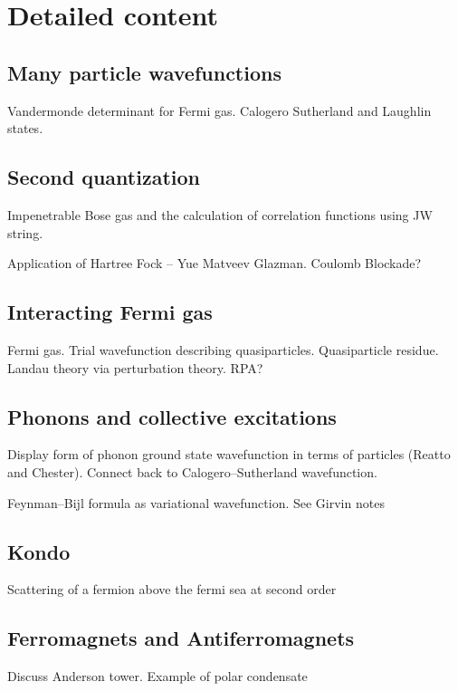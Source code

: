 \section{Detailed content}

\subsection{Many particle wavefunctions}

Vandermonde determinant for Fermi gas. Calogero Sutherland and Laughlin states.

\subsection{Second quantization}

Impenetrable Bose gas and the calculation of correlation functions using JW string.

Application of Hartree Fock -- Yue Matveev Glazman. Coulomb Blockade?

\subsection{Interacting Fermi gas}

Fermi gas. Trial wavefunction describing quasiparticles. Quasiparticle residue. Landau theory via perturbation theory. RPA?

\subsection{Phonons and collective excitations}

Display form of phonon ground state wavefunction in terms of particles (Reatto and Chester). Connect back to Calogero--Sutherland wavefunction. 

Feynman--Bijl formula as variational wavefunction. See Girvin notes

\subsection{Kondo}

Scattering of a fermion above the fermi sea at second order

\subsection{Ferromagnets and Antiferromagnets}

Discuss Anderson tower. Example of polar condensate